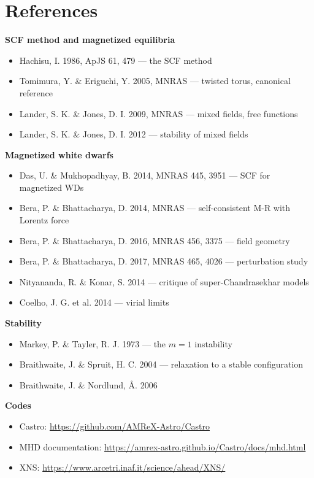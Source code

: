 \documentclass[11pt,a4paper]{scrartcl}
\begin{document}
\section{References}
\label{sec:refs}

\textbf{SCF method and magnetized equilibria}
\begin{itemize}[leftmargin=1.4em,itemsep=0.1em]
\item Hachisu, I. 1986, ApJS 61, 479 --- the SCF method
\item Tomimura, Y. \& Eriguchi, Y. 2005, MNRAS --- twisted torus, canonical reference
\item Lander, S. K. \& Jones, D. I. 2009, MNRAS --- mixed fields, free functions
\item Lander, S. K. \& Jones, D. I. 2012 --- stability of mixed fields
\end{itemize}

\textbf{Magnetized white dwarfs}
\begin{itemize}[leftmargin=1.4em,itemsep=0.1em]
\item Das, U. \& Mukhopadhyay, B. 2014, MNRAS 445, 3951 --- SCF for magnetized WDs
\item Bera, P. \& Bhattacharya, D. 2014, MNRAS --- self-consistent M-R with Lorentz force
\item Bera, P. \& Bhattacharya, D. 2016, MNRAS 456, 3375 --- field geometry
\item Bera, P. \& Bhattacharya, D. 2017, MNRAS 465, 4026 --- perturbation study
\item Nityananda, R. \& Konar, S. 2014 --- critique of super-Chandrasekhar models
\item Coelho, J. G. et al. 2014 --- virial limits
\end{itemize}

\textbf{Stability}
\begin{itemize}[leftmargin=1.4em,itemsep=0.1em]
\item Markey, P. \& Tayler, R. J. 1973 --- the $m=1$ instability
\item Braithwaite, J. \& Spruit, H. C. 2004 --- relaxation to a stable configuration
\item Braithwaite, J. \& Nordlund, Å. 2006
\end{itemize}

\textbf{Codes}
\begin{itemize}[leftmargin=1.4em,itemsep=0.1em]
\item Castro: \url{https://github.com/AMReX-Astro/Castro}
\item MHD documentation: \url{https://amrex-astro.github.io/Castro/docs/mhd.html}
\item XNS: \url{https://www.arcetri.inaf.it/science/ahead/XNS/}
\end{itemize}
\end{document}
